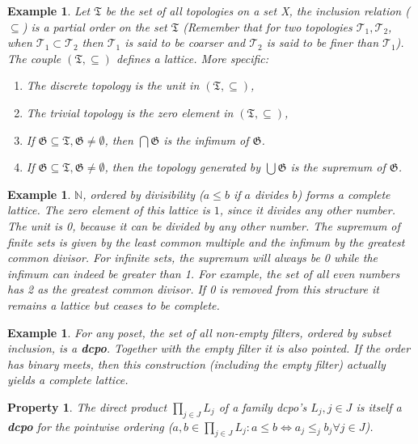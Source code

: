 \documentclass[a4paper,12pt]{article}
\newtheorem{example}[theorem]{Example}
\newtheorem{property}[theorem]{Property}
\newcommand{\N}{{\mathbb N}}
\begin{document}
\begin{example}
Let $\mathfrak{T}$ be the set of all topologies on a set X, the inclusion relation ($\subseteq$) is a partial order on the set $\mathfrak{T}$ (Remember that for two topologies $\mathcal{T}_1, \mathcal{T}_2$, when $\mathcal{T}_1 \subset \mathcal{T}_2$ then $\mathcal{T}_1$ is said to be coarser and $\mathcal{T}_2$ is said to be finer than $\mathcal{T}_1$). The couple $(\mathfrak{T}, \subseteq)$ defines a lattice. More specific:
\begin{enumerate}
  \item The discrete topology is the unit in $(\mathfrak{T}, \subseteq)$,
  \item The trivial topology is the zero element in $(\mathfrak{T}, \subseteq)$,
  \item If $\mathfrak{G} \subseteq \mathfrak{T}, \mathfrak{G} \neq \emptyset$, then $\bigcap \mathfrak{G}$ is the infimum of $\mathfrak{G}$.

  \item If $\mathfrak{G} \subseteq \mathfrak{T}, \mathfrak{G} \neq \emptyset$, then the topology generated by $\bigcup \mathfrak{G}$ is the supremum of $\mathfrak{G}$.
\end{enumerate}
\end{example}

\begin{example}
$\N$, ordered by divisibility ($a \leq b$ if $a$ divides $b$) forms a complete lattice. The zero element of this lattice is $1$, since it divides any other number. The unit is 0, because it can be divided by any other number. The supremum of finite sets is given by the least common multiple and the infimum by the greatest common divisor. For infinite sets, the supremum will always be 0 while the infimum can indeed be greater than 1. For example, the set of all even numbers has 2 as the greatest common divisor. If 0 is removed from this structure it remains a lattice but ceases to be complete.
\end{example}

\begin{example}
For any poset, the set of all non-empty filters, ordered by subset inclusion, is a \textbf{dcpo}. Together with the empty filter it is also pointed. If the order has binary meets, then this construction (including the empty filter) actually yields a complete lattice.
\end{example}

\begin{property}\label{directeproducten}
The direct product $\prod_{j\in J}L_j$ of a family dcpo's $L_j, j \in J$ is itself a \textbf{dcpo} for the pointwise ordering ($a, b \in \prod_{j\in J}L_j: a \leq b \Leftrightarrow a_j \leq_j b_j \forall j \in J$).
\end{property}
\end{document}

